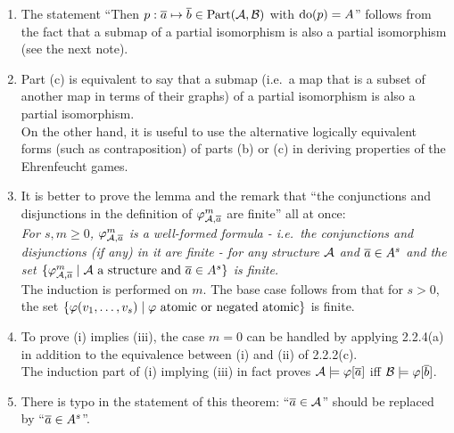\begin{enumerate}[1.]
%
\item {} The statement ``Then $p : \overline{a} \mapsto \overline{b} \in {\mathrm{Part}(\mathcal{A}, \mathcal{B})}$ with ${\mathrm{do}({p})} = A$'' follows from the fact that a submap of a partial isomorphism is also a partial isomorphism (see the next note).
%
\item {} Part (c) is equivalent to say that a submap (i.e.\ a map that is a subset of another map in terms of their graphs) of a partial isomorphism is also a partial isomorphism.
\medskip\\
On the other hand, it is useful to use the alternative logically equivalent forms (such as contraposition) of parts (b) or (c) in deriving properties of the Ehrenfeucht games.
%
\item {} It is better to prove the lemma and the remark that ``the conjunctions and disjunctions in the definition of $\varphi^{m}_{\mathcal{A}, \overline{a}}$ are finite'' all at once:
\medskip\\
\emph{For $s, m \geq 0$, $\varphi^{m}_{\mathcal{A}, \overline{a}}$ is a well-formed formula - i.e.\ the conjunctions and disjunctions (if any) in it are finite - for any structure $\mathcal{A}$ and $\overline{a} \in A^{s}$ and the set $\sett{\ityp{m}{\strct{A}, \vect{a}}}{\begin{math}\strct{A}\end{math} a structure and \begin{math}\vect{a} \in \cartpwr{A}{s}\end{math}}$ is finite.}
\medskip\\
The induction is performed on $m$. The base case follows from that for $s > 0$, the set $\sett{\varphi(\seq{v}{s})}{\begin{math}\varphi\end{math} atomic or negated atomic}$ is finite.
%
\item {} To prove (i) implies (iii), the case $m = 0$ can be handled by applying 2.2.4(a) in addition to the equivalence between (i) and (ii) of 2.2.2(c).
\medskip\\
The induction part of (i) implying (iii) in fact proves $\mathcal{A} \models \varphi[\overline{a}]$ iff $\mathcal{B} \models \varphi[\overline{b}]$.
%
\item {} There is typo in the statement of this theorem: ``$\overline{a} \in \mathcal{A}$'' should be replaced by ``$\overline{a} \in A^{s}$''.
%
\end{enumerate}


